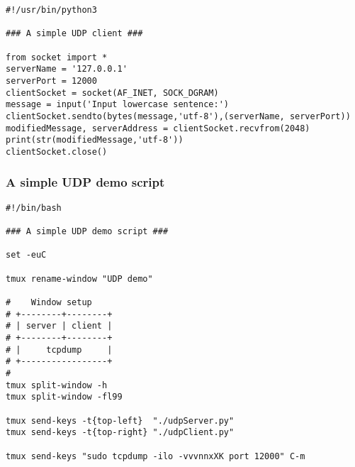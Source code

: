 \documentclass{article}
\begin{document}
\begin{verbatim}
#!/usr/bin/python3

### A simple UDP client ###

from socket import *
serverName = '127.0.0.1'
serverPort = 12000
clientSocket = socket(AF_INET, SOCK_DGRAM)
message = input('Input lowercase sentence:')
clientSocket.sendto(bytes(message,'utf-8'),(serverName, serverPort))
modifiedMessage, serverAddress = clientSocket.recvfrom(2048)
print(str(modifiedMessage,'utf-8'))
clientSocket.close()
\end{verbatim}

\subsubsection{A simple UDP demo script}
\label{sec:org235522c}

\begin{verbatim}
#!/bin/bash

### A simple UDP demo script ###

set -euC

tmux rename-window "UDP demo"

#    Window setup
# +--------+--------+
# | server | client |
# +--------+--------+
# |     tcpdump     |
# +-----------------+
#
tmux split-window -h
tmux split-window -fl99

tmux send-keys -t{top-left}  "./udpServer.py" 
tmux send-keys -t{top-right} "./udpClient.py"

tmux send-keys "sudo tcpdump -ilo -vvvnnxXK port 12000" C-m
\end{verbatim}
\end{document}
